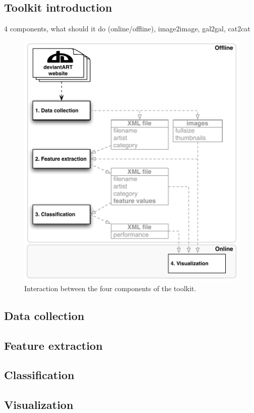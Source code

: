 \subsection{Toolkit introduction}
4 components, what should it do (online/offline), image2image, gal2gal, cat2cat

\begin{figure}[htb]
  \centering
  \includegraphics[width=1\linewidth]{img/components.pdf}
  \caption{Interaction between the four components of the toolkit.}
  \label{fig:components}
\end{figure}

\subsection{Data collection}
\subsection{Feature extraction}
\subsection{Classification}
\subsection{Visualization}

